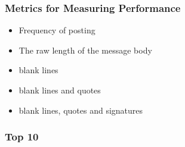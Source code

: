 \documentclass[compress]{beamer}
\begin{document}
\begin{frame}
 \frametitle{Metrics for Measuring Performance}

 \begin{itemize}
    \item Frequency of posting 
    \item The raw length of the message body 
    \item blank lines 
    \item blank lines and quotes
    \item blank lines, quotes and signatures
 \end{itemize}
\end{frame}


\begin{frame}
  \frametitle{Top 10 }
   \vspace{-5mm}

      \begin{center}
      \end{center}

\end{frame}
\end{document}
